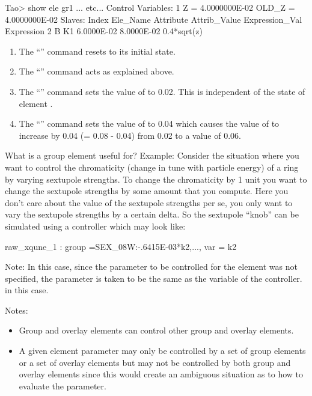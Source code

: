 \documentclass{hitec}     %
\begin{document}
\begin{code}
Tao> show ele gr1
... etc...
Control Variables:
    1   Z  =  4.0000000E-02           OLD_Z  =  4.0000000E-02
Slaves:
   Index   Ele_Name  Attribute   Attrib_Value  Expression_Val    Expression
       2   B         K1            6.0000E-02      8.0000E-02    0.4*sqrt(z)
\end{code}
\vspace{-5 pt}
\begin{enumerate}
\item
The ``'' command resets \tao to its initial state.
\item
The ``'' command acts as explained above.
\item
The ``'' command sets the value of  to 0.02. This is independent of the state of element .
\item
The ``'' command sets the value of  to 0.04 which causes the
value of  to increase by 0.04 (= 0.08 - 0.04) from 0.02 to a value of 0.06.
\end{enumerate}

What is a group element useful for? Example: Consider the situation where you want to control the
chromaticity (change in tune with particle energy) of a ring by varying sextupole strengths. To
change the chromaticity by 1 unit you want to change the sextupole strengths by some amount that you
compute. Here you don't care about the value of the sextupole strengths per se, you only want to vary the
sextupole strengths by a certain delta. So the sextupole ``knob'' can be simulated using a 
controller which may look like:
\begin{code} 
raw_xqune_1 : group ={SEX_08W:-.6415E-03*k2,...}, var = {k2}
\end{code}
Note: In this case, since the parameter to be controlled for the  element was not specified,
the parameter is taken to be the same as the variable of the controller.  in this case.

Notes:
\vspace{-5 pt}
\begin{itemize}
\item
Group and overlay elements can control other group and overlay elements.
\item
A given element parameter may only be controlled by a set of group elements or a set of overlay
elements but may not be controlled by both group and overlay elements since this would create
an ambiguous situation as to how to evaluate the parameter.
\end{itemize}
\end{document}
